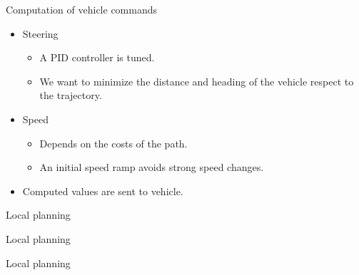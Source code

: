 \begin{frame}{Computation of vehicle commands}
  \begin{itemize}
    \item Steering
    \begin{itemize}
      \item A PID controller is tuned.
      \item We want to minimize the distance and heading of the vehicle respect to the trajectory.
    \end{itemize}
    \item Speed
    \begin{itemize}
      \item Depends on the costs of the path.
      \item An initial speed ramp avoids strong speed changes.
    \end{itemize}
    \item Computed values are sent to vehicle.
  \end{itemize}

\end{frame}

\begin{frame}{Local planning}
 \begin{figure}
 \end{figure}
\end{frame}

\begin{frame}{Local planning}
 \begin{figure}
 \end{figure}
\end{frame}

\begin{frame}{Local planning}
 \begin{figure}
 \end{figure}
\end{frame}
